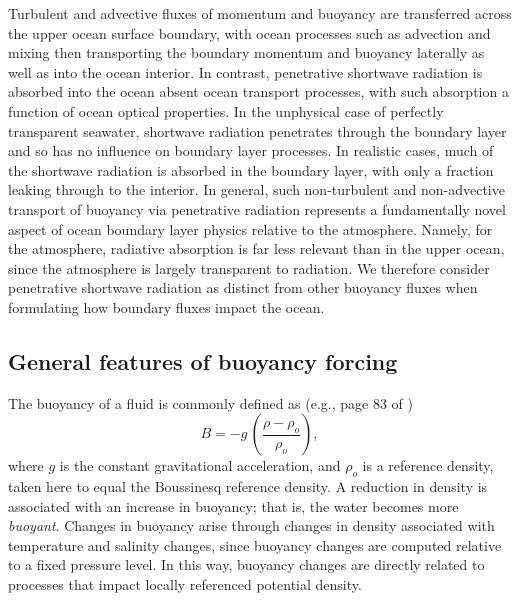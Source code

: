 Turbulent and advective fluxes of momentum and buoyancy are
transferred across the upper ocean surface boundary, with ocean
processes such as advection and mixing then transporting the boundary
momentum and buoyancy laterally as well as into the ocean interior.
In contrast, penetrative shortwave radiation is absorbed into the
ocean absent ocean transport processes, with such absorption a
function of ocean optical properties.  In the unphysical case of
perfectly transparent seawater, shortwave radiation penetrates through
the boundary layer and so has no influence on boundary layer
processes.  In realistic cases, much of the shortwave radiation is
absorbed in the boundary layer, with only a fraction leaking through
to the interior. In general, such non-turbulent and non-advective
transport of buoyancy via penetrative radiation represents a
fundamentally novel aspect of ocean boundary layer physics relative to
the atmosphere.  Namely, for the atmosphere, radiative absorption is
far less relevant than in the upper ocean, since the atmosphere is
largely transparent to radiation.  We therefore consider penetrative
shortwave radiation as distinct from other buoyancy fluxes when
formulating how boundary fluxes impact the ocean.


\subsection{General features of buoyancy forcing}

The buoyancy of a fluid is commonly defined as (e.g., page 83 of
\cite{LargeKPP_lectures})
\begin{equation}
 B = -g \, \left( \frac{ \rho - \rho_{o}}{\rho_{o}} \right), 
\label{eq:buoyancy-kpp}
\end{equation}
where $g$ is the constant gravitational acceleration, and $\rho_{o}$
is a reference density, taken here to equal the Boussinesq reference
density.  A reduction in density is associated with an increase in
buoyancy; that is, the water becomes more {\it buoyant}.  Changes in
buoyancy arise through changes in density associated with temperature
and salinity changes, since buoyancy changes are computed relative to
a fixed pressure level. In this way, buoyancy changes are directly
related to processes that impact locally referenced potential density.

